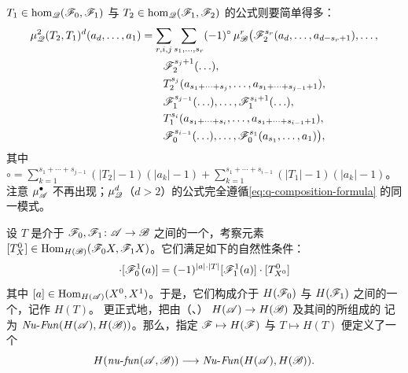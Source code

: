 $T_1\in\hom_{\mathscr{Q}}(\mathscr{F}_0,\mathscr{F}_1)$ 与
$T_2\in\hom_{\mathscr{Q}}(\mathscr{F}_1,\mathscr{F}_2)$ 的\trComposition{}公式则要简单得多：
\begin{equation}\label{eq:q-composition-formula}
\begin{split}
\mu^2_{\mathscr{Q}}(T_2,T_1)^d(a_d,\ldots,a_1)
&=\sum_{r,i,j}\sum_{s_1,\ldots,s_r}(-1)^{\circ}\,\mu^r_{\mathscr{B}}\bigl(
  \mathscr{F}_2^{s_r}(a_d,\ldots,a_{d-s_r+1}),\ldots,\\
&\qquad \mathscr{F}_2^{s_j+1}(\ldots),\\
&\qquad T_2^{s_j}(a_{s_1+\cdots+s_j},\ldots,a_{s_1+\cdots+s_{j-1}+1}),\\
&\qquad \mathscr{F}_1^{s_{j-1}}(\ldots),\ldots,\mathscr{F}_1^{s_i+1}(\ldots),\\
&\qquad T_1^{s_i}(a_{s_1+\cdots+s_i},\ldots,a_{s_1+\cdots+s_{i-1}+1}),\\
&\qquad \mathscr{F}_0^{s_{i-1}}(\ldots),\ldots,\mathscr{F}_0^{s_1}(a_{s_1},\ldots,a_1)\bigr),
\end{split}
\end{equation}
其中
$\circ=\sum\limits_{k=1}^{s_1+\cdots+s_{j-1}}(|T_2|-1)(|a_k|-1)
+\sum\limits_{k=1}^{s_1+\cdots+s_{i-1}}(|T_1|-1)(|a_k|-1)$。注意 $\mu^{\bullet}_{\mathscr{A}}$
不再出现；$\mu^d_{\mathscr{Q}}$（$d>2$）的公式完全遵循\eqref{eq:q-composition-formula}
的同一模式。

设 $T$ 是介于 \trAFunctor{} $\mathscr{F}_0,\mathscr{F}_1\colon\mathscr{A}\to\mathscr{B}$ 之间的一个\trNaturalTransformation{}，考察元素
$[T^0_X]\in\operatorname{Hom}_{H(\mathscr{B})}(\mathscr{F}_0X,\mathscr{F}_1X)$。它们满足如下的自然性条件：
\begin{equation*}
[T^0_{X^1}]\cdot[\scr{F}_0^1(a)]=(-1)^{|a|\cdot|T|}[\scr{F}_1^1(a)]\cdot[T^0_{X^0}]
\end{equation*}
其中 $[a]\in\operatorname{Hom}_{H(\mathscr{A})}(X^0,X^1)$。于是，它们构成介于\trCohomology\trFunctor{}%
$H(\mathscr{F}_0)$ 与 $H(\mathscr{F}_1)$ 之间的一个\trNaturalTransformation{}，记作 $H(T)$。
更正式地，把由\trNonunital（\trLinear、\trGraded）\trFunctor{}%
$H(\mathscr{A})\to H(\mathscr{B})$ 及其间的\trNaturalTransformation{}所组成的\trCategory{}%
记为 $\mathit{Nu}\text{-}\mathit{Fun}(H(\mathscr{A}),H(\mathscr{B}))$。那么，指定
$\mathscr{F}\mapsto H(\mathscr{F})$ 与 $T\mapsto H(T)$ 便定义了一个\trNonunital\trFunctor
\begin{equation}\label{eq:H-of-nu-fun-to-Nu-Fun}
H(\mathit{nu}\text{-}\mathit{fun}(\mathscr{A},\mathscr{B}))
  \longrightarrow\mathit{Nu}\text{-}\mathit{Fun}(H(\mathscr{A}),H(\mathscr{B})).
\end{equation}
